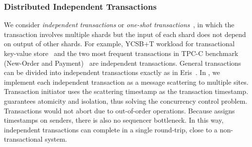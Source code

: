 \subsubsection{Distributed Independent Transactions}
\label{subsec:transactional-kvs}
We consider \emph{independent transactions} or \emph{one-shot transactions}~\cite{kallman2008h}, in which the transaction involves multiple shards but the input of each shard does not depend on output of other shards.
For example, YCSB+T workload for transactional key-value store~\cite{dey2014ycsbt} and the two most frequent transactions in TPC-C benchmark (New-Order and Payment)~\cite{tpcc} are independent transactions.
General transactions can be divided into independent transactions exactly as in Eris~\cite{eris}.
In \sys, we implement each independent transaction as a message scattering to multiple sites.
Transaction initiator uses the scattering timestamp as the transaction timestamp.
\sys guarantees atomicity and isolation, thus solving the concurrency control problem.
Transactions would not abort due to out-of-order operations.
Because \sys assigns timestamps on senders, there is also no sequencer bottleneck.
In this way, independent transactions can complete in a single round-trip, close to a non-transactional system.%



